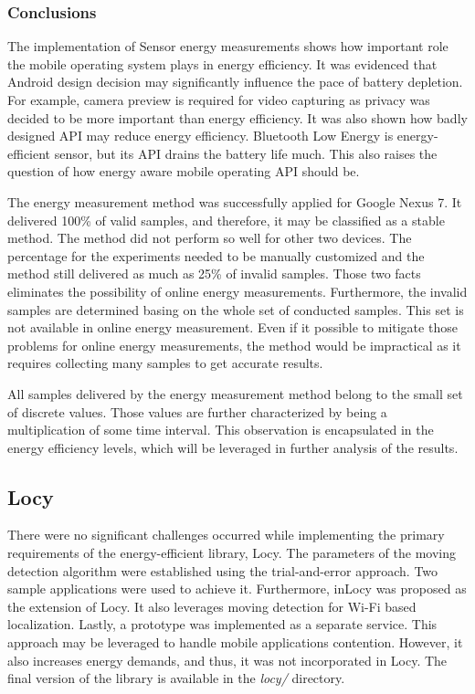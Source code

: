 \subsubsection{Conclusions}   
\hspace{10pt} The implementation of Sensor energy measurements shows how important role the mobile operating system plays in energy efficiency. It was evidenced that Android design decision may significantly influence the pace of battery depletion. For example, camera preview is required for video capturing as privacy was decided to be more important than energy efficiency. It was also shown how badly designed API may reduce energy efficiency. Bluetooth Low Energy is energy-efficient sensor, but its API drains the battery life much. This also raises the question of how energy aware mobile operating API should be.

The energy measurement method was successfully applied for Google Nexus 7. It delivered 100\% of valid samples, and therefore, it may be classified as a stable method. The method did not perform so well for other two devices. The percentage for the experiments needed to be manually customized and the method still delivered as much as 25\% of invalid samples. Those two facts eliminates the possibility of online energy measurements. Furthermore, the invalid samples are determined basing on the whole set of conducted samples. This set is not available in online energy measurement. Even if it possible to mitigate those problems for online energy measurements, the method would be impractical as it requires collecting many samples to get accurate results.  

All samples delivered by the energy measurement method belong to the small set of discrete values. Those values are further characterized by being a multiplication of some time interval. This observation is encapsulated in the energy efficiency levels, which will be leveraged in further analysis of the results. 

\subsection{Locy}
There were no significant challenges occurred while implementing the primary requirements of the energy-efficient library, Locy. The parameters of the moving detection algorithm were established using the trial-and-error approach. Two sample applications were used to achieve it. Furthermore, inLocy was proposed as the extension of Locy. It also leverages moving detection for Wi-Fi based localization. Lastly, a prototype was implemented as a separate service. This approach may be leveraged to handle mobile applications contention. However, it also increases energy demands, and thus, it was not incorporated in Locy. The final version of the library is available in the \textit{locy/} directory. 

